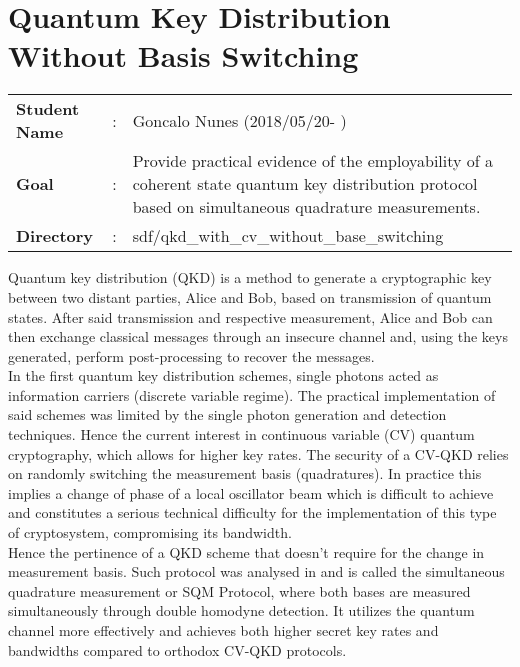 \clearpage
\section{Quantum Key Distribution Without Basis Switching}

\begin{refsection}

\begin{tcolorbox}	
\begin{tabular}{p{2.75cm} p{0.2cm} p{10.5cm}} 	
\textbf{Student Name}  &:&  Goncalo Nunes (2018/05/20- )\\
\textbf{Goal}          &:& Provide practical evidence of the employability of a coherent state quantum key distribution protocol based on simultaneous quadrature measurements.\\
\textbf{Directory}              &:& sdf/qkd\_with\_cv\_without\_base\_switching
\end{tabular}
\end{tcolorbox}Quantum key distribution (QKD) is a method to generate a cryptographic key between two distant parties, Alice and Bob, based on transmission of quantum states. After said transmission and respective measurement, Alice and Bob can then exchange classical messages through an insecure channel and, using the keys generated, perform post-processing to recover the messages.\\ 
In the first quantum key distribution schemes, single photons acted as information carriers (discrete variable regime). The practical implementation of said schemes was limited by the single photon generation and detection techniques. Hence the current interest in continuous variable (CV) quantum cryptography, which allows for higher key rates. The security of a CV-QKD relies on randomly switching the measurement basis (quadratures). In practice this implies a change of phase of a local oscillator beam which is difficult to achieve and constitutes a serious technical difficulty for the implementation of this type of cryptosystem, compromising its bandwidth.\\
Hence the pertinence of a QKD scheme that doesn't require for the change in measurement basis. Such protocol was analysed in \cite{Weedbrook2004} and is called the simultaneous quadrature measurement or SQM Protocol, where both bases are measured simultaneously through double homodyne detection. It utilizes the quantum channel more effectively and achieves both higher secret key rates and bandwidths compared to orthodox CV-QKD protocols.

\end{refsection}
